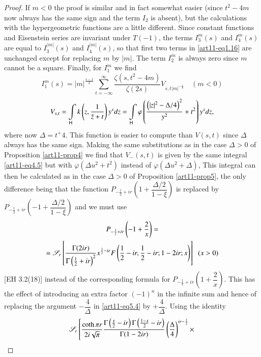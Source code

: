 \begin{proof}
If $m < 0$ the proof is similar and in fact somewhat easier (since $t^2- 4 m$ now always has the same sign and the term $I_2$ is absent), but the calculations with the hypergeometric functions are a little different. Since constant functions and Eisenstein series are invariant under $T(-1)$, the terms $I^m_3 (s)$ and $I^m_4(s)$ are equal to $I^{|m|}_3(s)$ and $I^{|m|}_4(s)$, so that first two terms in \eqref{art11-eq1.16} are unchanged except for replacing $m$ by $|m|$. The term $I^m_2$ is always zero since $m$ cannot be a square. Finally, for $I^m_1$ we find 
\begin{equation*}
I^m_1 (s) = |m|^{\frac{s-1}{2}} \sum\limits^\infty_{t = - \infty} \frac{\zeta(s,t^2 - 4 m)}{\zeta(2s)} V_{s, t |m|^{-\frac{1}{2}}} \quad (m<0)\tag{5.6}
\label{art11-eq5.6}
\end{equation*}
$$
V_{s,t} = \int\limits_{\mathsf{H}} k \left(z, \frac{1}{\bar{z} + t} \right) y^s dz = \int\limits_{\mathsf{H}} \varphi \left(\frac{\left(|z|^2 - \Delta / 4 \right)^2}{y^2} + t^2 \right) y^s dz,
$$
where now $\Delta = t^ +4$. This function is easier to compute than $V(s,t)$ since $\Delta$ always has the same sign. Making the same substitutions as in the case $\Delta >0$ of Proposition \eqref{art11-prop4} we find that $V_-(s,t)$ is given by the same integral \eqref{art11-eq4.5} but with $\varphi (\Delta u^2 + t^2)$ instead of $\varphi (\Delta u^2+ \Delta)$, This integral can then be calculated as in the case $\Delta > 0$ of Proposition \ref{art11-prop5}, the only difference being that the function $P_{-\frac{1}{2} + ir} \left(1+\dfrac{\Delta /2}{1-\xi} \right)$ is replaced by $P_{-\frac{1}{2} + ir} \left(-1 + \dfrac{\Delta /2}{1-\xi}\right)$ and we must use
\begin{multline*}
P_{-\frac{1}{2} + ir} \left(-1 + \frac{2}{x}  \right) =  \\
 = \mathscr{S}_r \left[ \frac{\Gamma (2 ir)}{\Gamma \left(\frac{1}{2} + ir \right)^2} x^{\frac{1}{2} - ir} F \left(\frac{1}{2}  - ir, \frac{1}{2} - ir; 1 - 2 ir; x \right) \right] \;\; (x>0)
\end{multline*}
[EH 3.2(18)] instead of the corresponding formula for $P_{-\frac{1}{2} + ir} \left(1+ \dfrac{2}{x} \right)$. This has the effect of introducing an extra factor $(-1)^n$ in the infinite sum and hence of replacing the argument $-\dfrac{4}{\Delta}$ in \eqref{art11-eq5.4} by $+ \dfrac{4}{\Delta}$. Using the identity 
\begin{gather*}
\sS_r \left[\frac{\coth \pi r}{2i \sqrt{\pi}}  \frac{\Gamma \left(\frac{s}{2} - ir \right) \Gamma \left(\frac{1-s}{2} - ir \right)}{\Gamma (1 - 2 ir)} \left(\frac{\Delta}{4} \right)^{ir - \frac{1}{2}} \times \right.\\

\end{gather*}
\end{proof}
